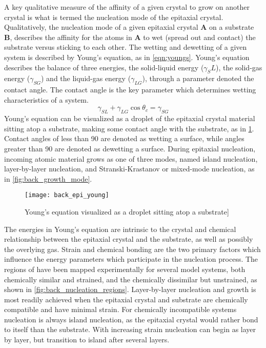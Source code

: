 A key qualitative measure of the affinity of a given crystal to grow on another crystal is what is termed the nucleation mode of the epitaxial crystal. Qualitatively, the nucleation mode of a given epitaxial crystal \textbf{A} on a substrate \textbf{B}, describes the affinity for the atoms in \textbf{A} to wet (spread out and contact) the substrate versus sticking to each other. The wetting and dewetting of a given system is described by Young's equation, as in \cref{eqn:youngs}. Young's equation describes the balance of three energies, the solid-liquid energy ($\gamma_SL$), the solid-gas energy ($\gamma_{SG}$) and the liquid-gas energy ($\gamma_{LG}$), through a parameter denoted the contact angle. The contact angle is the key parameter which determines wetting characteristics of a system.
\begin{equation}
\gamma_{SL} + \gamma_{LG} \cos{\theta_c} = \gamma_{SG} \label{eqn:youngs}
\end{equation}
Young's equation can be visualized as a droplet of the epitaxial crystal material sitting atop a substrate, making some contact angle with the substrate, as in \cref{fig:back_epi_young}. Contact angles of less than 90\degree{} are denoted as wetting a surface, while angles greater than 90\degree{} are denoted as dewetting a surface. During epitaxial nucleation, incoming atomic material grows as one of three modes, named island nucleation, layer-by-layer nucleation, and Stranski-Krastanov or mixed-mode nucleation, as in \cref{fig:back_growth_mode}. 
\begin{figure}
    \centering
    \texttt{[image: back\_epi\_young]}
    \caption{\label{fig:back_epi_young}Young's equation visualized as a droplet sitting atop a substrate\cite{wikipedia}]}
\end{figure}

The energies in Young's equation are intrinsic to the crystal and chemical relationship between the epitaxial crystal and the substrate, as well as possibly the overlying gas. Strain and chemical bonding are the two primary factors which influence the energy parameters which participate in the nucleation process. The regions of have been mapped experimentally for several model systems, both chemically similar and strained, and the chemically dissimilar but unstrained, as shown in \cref{fig:back_nucleation_regions}. Layer-by-layer nucleation and growth is most readily achieved when the epitaxial crystal and substrate are chemically compatible and have minimal strain. For chemically incompatible systems nucleation is always island nucleation, as the epitaxial crystal would rather bond to itself than the substrate. With increasing strain nucleation can begin as layer by layer, but transition to island after several layers.

